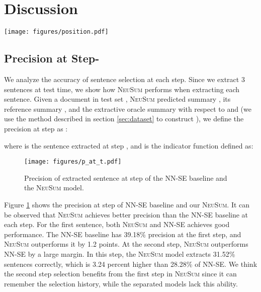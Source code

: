 \documentclass[11pt,a4paper]{article}
\newcommand{\ourModelName}{\textsc{NeuSum}}
\begin{document}
 \section{Discussion}

\begin{figure*}[htbp]
	\centering
	\texttt{[image: figures/position.pdf]}
	\caption{\label{fig:sent_position} Position distribution of selected sentences of the \textsc{NN-SE} baseline, our \ourModelName{} model and oracle on the test set. We only draw the first 30 sentences since the average document length is 27.05.}
\end{figure*}

\subsection{Precision at Step-}
\label{sec:prection_at_t}
We analyze the accuracy of sentence selection at each step.
Since we extract 3 sentences at test time, we show how \ourModelName{} performs when extracting each sentence.
Given a document  in test set , \ourModelName{} predicted summary , its reference summary , and the extractive oracle summary  with respect to  and  (we use the method described in section \ref{sec:dataset} to construct ), 
we define the precision at step  as :

where  is the sentence extracted at step , and  is the indicator function defined as:


\begin{figure}[htbp]
	\centering
	\texttt{[image: figures/p\_at\_t.pdf]}
	\caption{\label{fig:p_at_t} Precision of extracted sentence at step  of the \textsc{NN-SE} baseline and the \ourModelName{} model.}
\end{figure}


Figure \ref{fig:p_at_t} shows the precision at step   of \textsc{NN-SE} baseline and our \ourModelName{}.
It can be observed that \ourModelName{} achieves better precision than the \textsc{NN-SE} baseline at each step.
For the first sentence, both \ourModelName{} and \textsc{NN-SE} achieves good performance.
The \textsc{NN-SE} baseline has 39.18\% precision at the first step, and \ourModelName{} outperforms it by 1.2 points.
At the second step, \ourModelName{} outperforms \textsc{NN-SE} by a large margin.
In this step, the \ourModelName{} model extracts 31.52\% sentences correctly, which is 3.24 percent higher than 28.28\% of \textsc{NN-SE}.
We think the second step selection benefits from the first step in \ourModelName{} since it can remember the selection history, while the separated models lack this ability.
\end{document}
